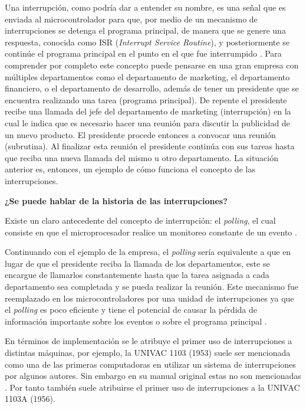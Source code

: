 \documentclass[a4paper,11pt]{article}
\begin{document}
Una interrupción, como podría dar a entender su nombre, es una señal \cite[p.217]{burrell2003fundamentals} que es enviada al microcontrolador para que, por medio de un mecanismo de interrupciones \cite[p.217]{burrell2003fundamentals} se detenga el programa principal, de manera que se genere una respuesta, conocida como ISR (\emph{Interrupt Service Routine}), y posteriormente se continúe el programa principal en el punto en el que fue interrumpido \cite[p.1]{reyes2015arduino}.
Para comprender por completo este concepto puede pensarse en una gran empresa con múltiples departamentos como el departamento de marketing, el departamento financiero, o el departamento de desarrollo, además de tener un presidente que se encuentra realizando una tarea (programa principal). De repente el presidente recibe una llamada del jefe del departamento de marketing (interrupción) en la cual le indica que es necesario hacer una reunión para discutir la publicidad de un nuevo producto. El presidente procede entonces a convocar una reunión (subrutina). Al finalizar esta reunión el presidente continúa con sus tareas hasta que reciba una nueva llamada del mismo u otro departamento. La situación anterior es, entonces, un ejemplo de cómo funciona el concepto de las interrupciones.



{\large\bfseries ¿Se puede hablar de la historia de las interrupciones?} 

Existe un claro antecedente del concepto de interrupción: el \emph{polling}, el cual consiste en que el microprocesador realice un monitoreo constante de un evento \cite[p.1]{reyes2015arduino}. 

Continuando con el ejemplo de la empresa, el \emph{polling} sería equivalente a que en lugar de que el presidente reciba la llamada de los departamentos, este se encargue de llamarlos constantemente hasta que la tarea asignada a cada departamento sea completada y se pueda realizar la reunión. Este mecanismo fue reemplazado en los microcontroladores por una unidad de interrupciones ya que el \emph{polling} es poco eficiente y tiene el potencial de causar la pérdida de información importante sobre los eventos o sobre el programa principal \cite[p.2]{reyes2015arduino}.

En términos de implementación se le atribuye el primer uso de interrupciones a distintas máquinas, por ejemplo, la UNIVAC 1103 (1953) suele ser mencionada como una de las primeras computadoras en utilizar un sistema de interrupciones \cite[p.181]{historia1}por algunos autores. Sin embargo en su manual original estas no son mencionadas \cite{smotherman_2017}. Por tanto también suele atribuirse el primer uso de interrupciones a la UNIVAC 1103A (1956)\cite{smotherman_2017}\cite{historia2}.
\end{document}
